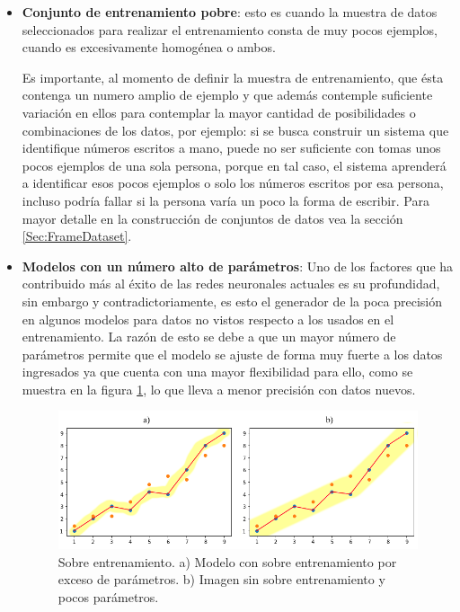         \begin{itemize}
            \item \textbf{Conjunto de entrenamiento pobre}: esto es cuando la muestra de datos seleccionados para realizar el entrenamiento consta de muy pocos ejemplos, cuando es excesivamente homogénea o ambos.
            
            Es importante, al momento de definir la muestra de entrenamiento, que ésta contenga un numero amplio de ejemplo y que además contemple suficiente variación en ellos para contemplar la mayor cantidad de posibilidades o combinaciones de los datos, por ejemplo: si se busca construir un sistema que identifique números escritos a mano, puede no ser suficiente con tomas unos pocos ejemplos de una sola persona, porque en tal caso, el sistema aprenderá a identificar esos pocos ejemplos o solo los números escritos por esa persona, incluso podría fallar si la persona varía un poco la forma de escribir. Para mayor detalle en la construcción de conjuntos de datos vea la sección \ref{Sec:FrameDataset}.
            
            \item \textbf{Modelos con un número alto de parámetros}: Uno de los factores que ha contribuido más al éxito de las redes neuronales actuales es su profundidad, sin embargo y contradictoriamente, es esto el generador de la poca precisión en algunos modelos para datos no vistos respecto a los usados en el entrenamiento. La razón de esto se debe a que un mayor número de parámetros permite que el modelo se ajuste de forma muy fuerte a los datos ingresados ya que cuenta con una mayor flexibilidad para ello,  como se muestra en la figura \ref{fig:OverFitting}, lo que lleva a menor precisión con datos nuevos.
            
            \begin{figure}[ht!]
            	\centering
            	\includegraphics[width=0.7\linewidth]{imgs/02-Referential/02-overfitting.png}
            	\caption[Sobre entrenamiento]{Sobre entrenamiento. a) Modelo con sobre entrenamiento por exceso de parámetros. b) Imagen sin sobre entrenamiento y pocos parámetros.}
        	    \label{fig:OverFitting}
            \end{figure}%
            
        \end{itemize}

